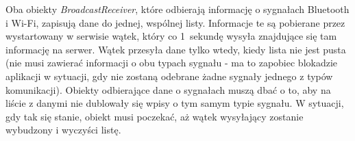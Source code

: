 Oba obiekty \textit{BroadcastReceiver}, które odbierają informację o sygnałach Bluetooth i Wi-Fi, zapisują dane do jednej, wspólnej listy. Informacje te są pobierane przez wystartowany w serwisie wątek, który co 1~sekundę wysyła znajdujące się tam informację na serwer. Wątek przesyła dane tylko wtedy, kiedy lista nie jest pusta (nie musi zawierać informacji o obu typach sygnału - ma to zapobiec blokadzie aplikacji w sytuacji, gdy nie zostaną odebrane żadne sygnały jednego z typów komunikacji). Obiekty odbierające dane o sygnałach muszą dbać o to, aby na liście z danymi nie dublowały się wpisy o tym samym typie sygnału. W sytuacji, gdy tak się stanie, obiekt musi poczekać, aż wątek wysyłający zostanie wybudzony i wyczyści listę.